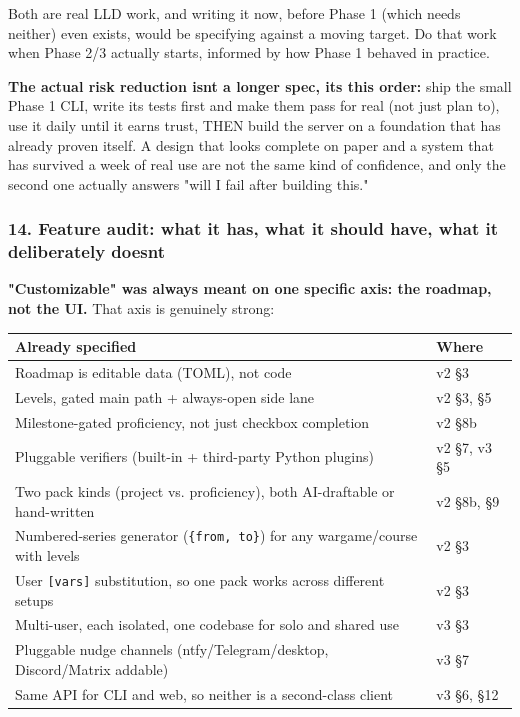 Both are real LLD work, and writing it now, before Phase 1 (which needs
neither) even exists, would be specifying against a moving target. Do
that work when Phase 2/3 actually starts, informed by how Phase 1
behaved in practice.

\textbf{The actual risk reduction isn\textquotesingle t a longer spec,
it\textquotesingle s this order:} ship the small Phase 1 CLI, write its
tests first and make them pass for real (not just plan to), use it daily
until it earns trust, THEN build the server on a foundation that has
already proven itself. A design that looks complete on paper and a
system that has survived a week of real use are not the same kind of
confidence, and only the second one actually answers "will I fail after
building this."

\hypertarget{spec-v3-public-release-14-feature-audit-what-it-has-what-it-should-have-what-it-deliberately-doesnt}{%
\subsubsection{14. Feature audit: what it has, what it should have, what
it deliberately
doesn\textquotesingle t}\label{spec-v3-public-release-14-feature-audit-what-it-has-what-it-should-have-what-it-deliberately-doesnt}}

\textbf{"Customizable" was always meant on one specific axis: the
roadmap, not the UI.} That axis is genuinely strong:

\begin{longtable}[]{@{}P{.36\textwidth}P{.59\textwidth}@{}}
\toprule\noalign{}
Already specified & Where \\
\midrule\noalign{}
\endhead
\bottomrule\noalign{}
\endlastfoot
Roadmap is editable data (TOML), not code & v2 §3 \\
Levels, gated main path + always-open side lane & v2 §3, §5 \\
Milestone-gated proficiency, not just checkbox completion & v2 §8b \\
Pluggable verifiers (built-in + third-party Python plugins) & v2 §7, v3
§5 \\
Two pack kinds (project vs. proficiency), both AI-draftable or
hand-written & v2 §8b, §9 \\
Numbered-series generator (\texttt{\{from, to\}}) for any
wargame/course with levels & v2 §3 \\
User \texttt{{[}vars{]}} substitution, so one pack works across
different setups & v2 §3 \\
Multi-user, each isolated, one codebase for solo and shared use & v3
§3 \\
Pluggable nudge channels (ntfy/Telegram/desktop, Discord/Matrix addable)
& v3 §7 \\
Same API for CLI and web, so neither is a second-class client & v3 §6,
§12 \\
\end{longtable}

